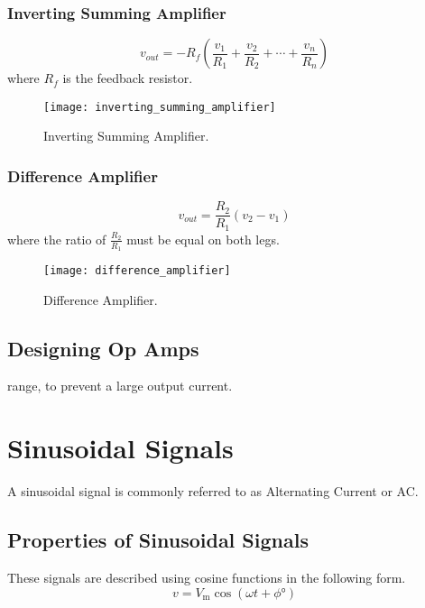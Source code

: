 \documentclass{article}
\begin{document}
\subsubsection{Inverting Summing Amplifier}
\begin{equation*}
    v_{out} = -R_f \left( \frac{v_1}{R_1} + \frac{v_2}{R_2} + \cdots + \frac{v_n}{R_n} \right)
\end{equation*}
where $R_f$ is the feedback resistor.
\begin{figure}[H]
    \centering
    \texttt{[image: inverting\_summing\_amplifier]}
    \caption{Inverting Summing Amplifier.}
\end{figure}
\subsubsection{Difference Amplifier}
\begin{equation*}
    v_{out} = \frac{R_2}{R_1} \left( v_2 - v_1 \right)
\end{equation*}
where the ratio of $\displaystyle \frac{R_2}{R_1}$ must be equal on both legs.
\begin{figure}[H]
    \centering
    \texttt{[image: difference\_amplifier]}
    \caption{Difference Amplifier.}
\end{figure}
\subsection{Designing Op Amps}
range, to prevent a large output current.
\newpage
\section{Sinusoidal Signals}
\begin{definition}
    A sinusoidal signal is commonly referred to as Alternating Current or AC. 
\end{definition}
\subsection{Properties of Sinusoidal Signals}
These signals are described using cosine functions in the following form.
\begin{equation*}
    v = V_{\mathrm{m}} \cos{\left( \omega t + \phi\si{\degree} \right)}
\end{equation*}
\end{document}
